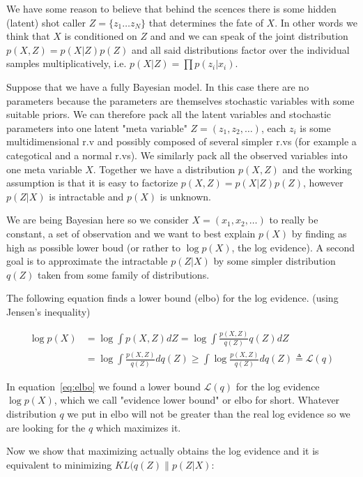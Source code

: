 \documentclass[11pt, a4paper]{report}
\theoremstyle{plain}
\theoremstyle{definition}
\theoremstyle{remark}
\begin{document}
We have some reason to believe that behind the scences there is some hidden
(latent) shot caller $Z = \{z_1 \dots z_N\}$ that determines the fate of $X$.
In other words we think that $X$ is conditioned on $Z$ and and we can speak of
the joint distribution $p(X,Z) = p(X|Z)p(Z)$ and all said distributions factor
over the individual samples multiplicatively, i.e.
$p(X|Z) = \prod p(z_i | x_i)$.

Suppose that we have a fully Bayesian model. In this case there are no
parameters because the parameters are themselves stochastic variables with some
suitable priors. We can therefore pack all the latent variables and stochastic
parameters into one latent "meta variable" $Z = (z_1, z_2, \dots )$, each $z_i$
is some multidimensional r.v and possibly composed of several simpler r.vs (for
example a categotical and a normal r.vs).
We similarly pack all the observed variables into one meta variable $X$.
Together we have a distribution $p(X,Z)$ and the working assumption is that it
is easy to factorize $p(X,Z) = p(X|Z)p(Z)$, however $p(Z|X)$ is intractable and
$p(X)$ is unknown.

We are being Bayesian here so we consider $X = (x_1, x_2, \dots)$ to really be
constant, a set of observation and we want to best explain $p(X)$ by finding as
high as possible lower boud (or rather to $\log p(X)$, the log evidence).
A second goal is to approximate the intractable $p(Z|X)$ by some simpler
distribution $q(Z)$ taken from some family of distributions.

The following equation finds a lower bound (elbo) for the log evidence.
(using Jensen's inequality)

\begin{equation}\label{eq:elbo}
\begin{aligned}
\log p(X) &= \log \int p(X,Z) dZ = \log \int \frac{p(X,Z)}{q(Z)} q(Z)dZ \\
&= \log \int \frac{p(X,Z)}{q(Z)}dq(Z) 
\geq \int \log \frac{p(X,Z)}{q(Z)}dq(Z) 
\triangleq \mathcal{L}(q)
\end{aligned}
\end{equation}

In equation~\ref{eq:elbo} we found a lower bound $\mathcal{L}(q)$ for the log
evidence $\log p(X)$, which we call "evidence lower bound" or elbo for short.
Whatever distribution $q$ we put in elbo will not be
greater than the real log evidence so we are looking for the $q$ which
maximizes it.

Now we show that maximizing actually obtains the log evidence and it is
equivalent to minimizing $KL(q(Z) \| p(Z|X)$:
\end{document}
